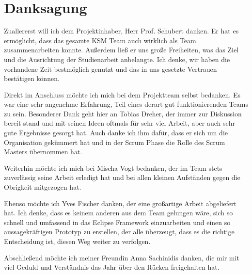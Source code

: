 \section*{Danksagung}

Zuallererst will ich dem Projektinhaber, Herr Prof. Schubert danken. Er hat es ermöglicht, dass das gesamte KSM Team auch wirklich als Team zusammenarbeiten konnte. Außerdem ließ er uns große Freiheiten, was das Ziel und die Ausrichtung der Studienarbeit anbelangte. Ich denke, wir haben die vorhandene Zeit bestmöglich genutzt und das in uns gesetzte Vertrauen bestätigen können. 

Direkt im Anschluss möchte ich mich bei dem Projektteam selbst bedanken. Es war eine sehr angenehme Erfahrung, Teil eines derart gut funktionierenden Teams zu sein. Besonderer Dank geht hier an Tobias Dreher, der immer zur Diskussion bereit stand und mit seinen Ideen oftmals für sehr viel Arbeit, aber auch sehr gute Ergebnisse gesorgt hat. Auch danke ich ihm dafür, dass er sich um die Organisation gekümmert hat und in der Scrum Phase die Rolle des Scrum Masters übernommen hat.

Weiterhin möchte ich mich bei Mischa Vogt bedanken, der im Team stets zuverlässig seine Arbeit erledigt hat und bei allen kleinen Aufständen gegen die Obrigkeit mitgezogen hat.

Ebenso möchte ich Yves Fischer danken, der eine großartige Arbeit abgeliefert hat. Ich denke, dass es keinem anderen aus dem Team gelungen wäre, sich so schnell und umfassend in das Eclipse Framework einzuarbeiten und einen so aussagekräftigen Prototyp zu erstellen, der alle überzeugt, dass es die richtige Entscheidung ist, diesen Weg weiter zu verfolgen.

Abschließend möchte ich meiner Freundin Anna Sachinidis danken, die mir mit viel Geduld und Verständnis das Jahr über den Rücken freigehalten hat.